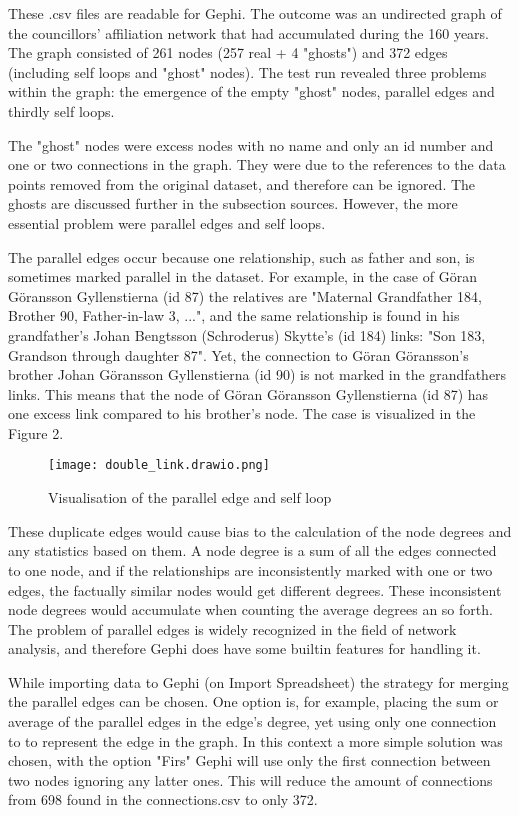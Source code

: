 \documentclass[a4paper,12pt]{article}
\begin{document}
These .csv files are readable for Gephi. The outcome was an undirected graph of the councillors' affiliation network that had accumulated during the 160 years. The graph consisted of 261 nodes (257 real + 4 "ghosts") and 372 edges (including self loops and "ghost" nodes). The test run revealed three problems within the graph: the emergence of the empty "ghost" nodes, parallel edges and thirdly self loops. 

The "ghost" nodes were excess nodes with no name and only an id number and one or two connections in the graph. They were due to the references to the data points removed from the original dataset, and therefore can be ignored. The ghosts are discussed further in the subsection sources. However, the more essential problem were parallel edges and self loops.

The parallel edges occur because one relationship, such as father and son, is sometimes marked parallel in the dataset. For example, in the case of Göran Göransson Gyllenstierna (id 87) the relatives are "Maternal Grandfather 184, Brother 90, Father-in-law 3, ...", and the same relationship is found in his grandfather's Johan Bengtsson (Schroderus) Skytte's (id 184) links: "Son 183, Grandson through daughter 87". Yet, the connection to Göran Göransson's brother Johan Göransson Gyllenstierna (id 90) is not marked in the grandfathers links. This means that the node of Göran Göransson Gyllenstierna (id 87) has one excess link compared to his brother's node. The case is visualized in the Figure 2.

\begin{figure}[h]
	\texttt{[image: double\_link.drawio.png]}
	\centering
	\caption{Visualisation of the parallel edge and self loop} 
	\centering
\end{figure}

These duplicate edges would cause bias to the calculation of the node degrees and any statistics based on them. A node degree is a sum of all the edges connected to one node, and if the relationships are inconsistently marked with one or two edges, the factually similar nodes would get different degrees. These inconsistent node degrees would accumulate when counting the average degrees an so forth. The problem of parallel edges is widely recognized in the field of network analysis, and therefore Gephi does have some builtin features for handling it.

While importing data to Gephi (on Import Spreadsheet) the strategy for merging the parallel edges can be chosen. One option is, for example, placing the sum or average of the parallel edges in the edge's degree, yet using only one connection to to represent the edge in the graph. In this context a more simple solution was chosen, with the option "Firs" Gephi will use only the first connection between two nodes ignoring any latter ones. This will reduce the amount of connections from 698 found in the connections.csv to only 372.
\end{document}
